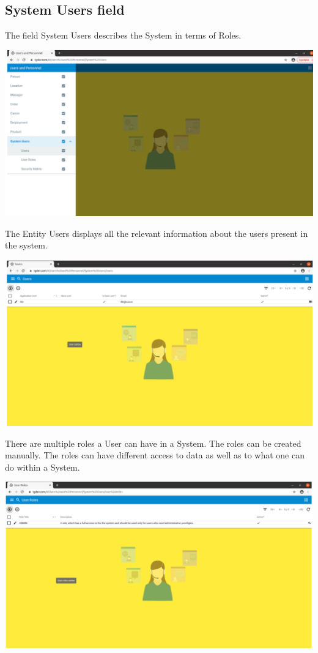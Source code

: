 \subsection{System Users field}

The field System Users describes the System in terms of Roles. 

\includegraphics[width=\textwidth]{sections/01-chapter/images/system1.png}

The Entity Users displays all the relevant information about the users present in the system.

\includegraphics[width=\textwidth]{sections/01-chapter/images/system2.png}

There are multiple roles a User can have in a System. The roles can be created manually. The roles can have different access to data as well as to what one can do within a System.

\includegraphics[width=\textwidth]{sections/01-chapter/images/system3.png}


